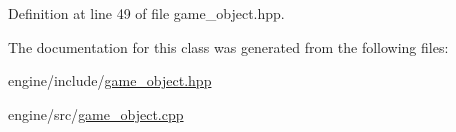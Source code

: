 Definition at line 49 of file game\+\_\+object.\+hpp.



The documentation for this class was generated from the following files\+:\begin{DoxyCompactItemize}
\item 
engine/include/\hyperlink{game__object_8hpp}{game\+\_\+object.\+hpp}\item 
engine/src/\hyperlink{game__object_8cpp}{game\+\_\+object.\+cpp}\end{DoxyCompactItemize}
